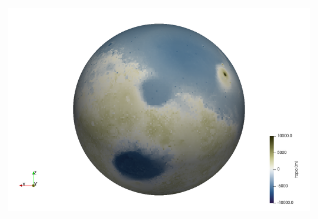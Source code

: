 \begin{center}
\includegraphics[width=8cm]{python_codes/fieldstone_100/images/topo3Dd}
\end{center}

